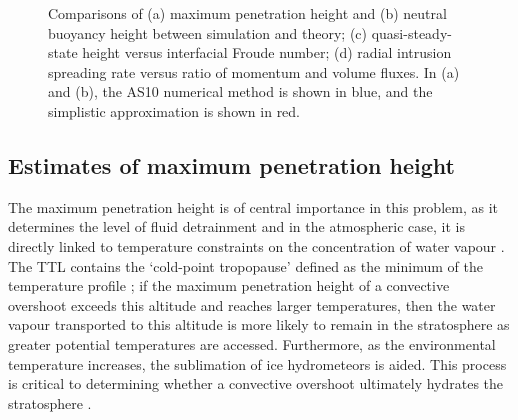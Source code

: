 \documentclass[a4paper]{article}
\begin{document}
\begin{figure}
	\centering
	\caption{Comparisons of (a) maximum penetration height and (b) neutral buoyancy height between simulation
	and theory; (c) quasi-steady-state height versus interfacial Froude number; (d) radial intrusion spreading
	rate versus ratio of momentum and volume fluxes. In (a) and (b), the AS10 numerical method is shown in
	blue, and the simplistic approximation is shown in red.} 
	\label{fig:zcomp}
\end{figure}

\subsection{Estimates of maximum penetration height}
The maximum penetration height is of central importance in this problem, as it determines the level
of fluid detrainment \citep{ansong2008} and in the atmospheric case, it is directly linked to temperature
constraints on the concentration of water vapour \citep{jensen2007}. The TTL contains the `cold-point
tropopause' defined as the minimum of the temperature profile \citep{fueglistaler2009}; if the maximum
penetration height of a convective overshoot exceeds this altitude and reaches larger temperatures, then the water
vapour transported to this altitude is more likely to remain in the stratosphere as greater potential
temperatures are accessed. Furthermore, as the environmental temperature increases, the sublimation of ice
hydrometeors is aided. This process is critical to determining whether a convective overshoot ultimately
hydrates the stratosphere \citep{dauhut2018}.
\end{document}

